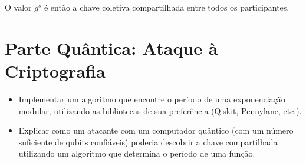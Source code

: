 \documentclass[a4paper,12pt]{article}
\begin{document}
O valor \( g^{s} \) é então a chave coletiva compartilhada entre todos os participantes.

\cite{boneh2020graduate}

\section{Parte Quântica: Ataque à Criptografia}
\begin{itemize}
    \item Implementar um algoritmo que encontre o período de uma exponenciação modular, utilizando as bibliotecas de sua preferência (Qiskit, Pennylane, etc.).
    \item Explicar como um atacante com um computador quântico (com um número suficiente de qubits confiáveis) poderia descobrir a chave compartilhada utilizando um algoritmo que determina o período de uma função.
\end{itemize}

\cite{website_example}
\printbibliography
\end{document}
